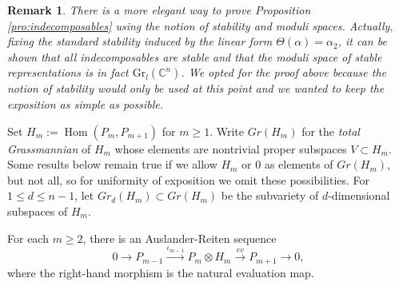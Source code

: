 \documentclass{amsart}
\newtheorem{remark}[theorem]{Remark}
\newcommand{\Gr}{\mathrm{Gr}}
\newcommand{\CC}{\mathbb{C}}
\newcommand{\Hom}{\operatorname{Hom}}
\begin{document}
\begin{remark}
  There is a more elegant way to prove Proposition \ref{pro:indecomposables} using the notion of stability and moduli spaces.
  Actually, fixing the standard stability induced by the linear form $\Theta(\alpha)=\alpha_2$, it can be shown that all indecomposables are stable and that the moduli space of stable representations is in fact $\Gr_l(\CC^n)$.
  We opted for the proof above because the notion of stability would only be used at this point and we wanted to keep the exposition as simple as possible. 
\end{remark}




Set $H_m:=\Hom(P_m,P_{m+1})$ for $m\ge1$. %
Write $Gr(H_m)$ for the \emph{total Grassmannian} of $H_m$ whose elements are nontrivial proper subspaces $V\subset H_m$.
Some results below remain true if we allow $H_m$ or $0$ as elements of $Gr(H_m)$, but not all, so for uniformity of exposition we omit these possibilities.
For $1\le d\le n-1$, let $Gr_d(H_m)\subset Gr(H_m)$ be the subvariety of $d$-dimensional subspaces of $H_m$.


For each $m\ge2$, there is an Auslander-Reiten sequence \cite[Section V]{ars}
\begin{equation}
  \label{eq:AR sequence}
  0\longrightarrow P_{m-1}\stackrel{\iota_{m-1}}{\longrightarrow} P_m\otimes H_m\stackrel{ev}{\longrightarrow} P_{m+1}\longrightarrow 0,
\end{equation}
where the right-hand morphism is the natural evaluation map.
\end{document}
